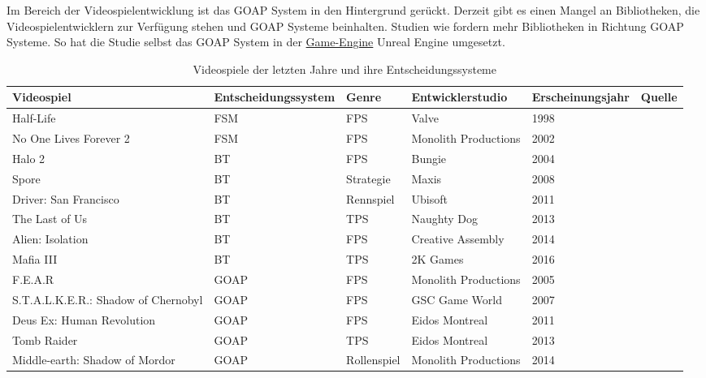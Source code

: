 Im Bereich der Videospielentwicklung ist das GOAP System in den Hintergrund ger\"{u}ckt. Derzeit gibt es einen Mangel an Bibliotheken, die Videospielentwicklern zur Verf\"{u}gung stehen und GOAP Systeme beinhalten. Studien wie \autocite{sielicki2018adaptation} fordern mehr Bibliotheken in Richtung GOAP Systeme. So hat die Studie selbst das GOAP System in der \hyperref[chap:game engines]{Game-Engine} Unreal Engine umgesetzt.


\begin{sidewaystable}[h]
	\caption{Videospiele der letzten Jahre und ihre Entscheidungssysteme}
  \label{tab:videospiele}
  \renewcommand{\arraystretch}{1.2}
  \centering
  \small
    \begin{tabularx}{0.95\textwidth}{l l x x x x}
			\toprule
      \textbf{Videospiel} & \textbf{Entscheidungssystem} & \textbf{Genre} & \textbf{Entwicklerstudio} & \textbf{Erscheinungsjahr} & \textbf{Quelle} \\
			\midrule
			Half-Life & FSM & FPS & Valve & 1998 & \autocite{halflife} \\
			No One Lives Forever 2 & FSM & FPS & Monolith Productions & 2002 & \autocite{fear} \\
			Halo 2 & BT & FPS & Bungie & 2004 & \autocite{aiag} \\
			Spore & BT & Strategie & Maxis & 2008 & \autocite{spore} \\
			Driver: San Francisco & BT & Rennspiel & Ubisoft & 2011 & \autocite{Ocio2021} \\
			The Last of Us & BT & TPS & Naughty Dog & 2013 & \autocite{panwar2022npcaiuscase} \\
			Alien: Isolation & BT & FPS & Creative Assembly & 2014 & \autocite{vsvelch2020should} \\
			Mafia III & BT & TPS & 2K Games & 2016 & \autocite{holba2021open} \\
			F.E.A.R & GOAP & FPS & Monolith Productions & 2005 & \autocite{fear} \\
      S.T.A.L.K.E.R.: Shadow of Chernobyl & GOAP & FPS & GSC Game World & 2007 & \autocite{sielicki2018adaptation} \\
      Deus Ex: Human Revolution & GOAP & FPS & Eidos Montreal & 2011 & \autocite{sielicki2018adaptation} \\
			Tomb Raider & GOAP & TPS & Eidos Montreal & 2013 & \autocite{goap_gdc} \\
      Middle-earth: Shadow of Mordor & GOAP & Rollenspiel & Monolith Productions & 2014 & \autocite{goap_gdc} \\
      \bottomrule
    \end{tabularx}
\end{sidewaystable}
